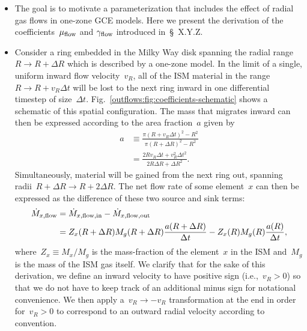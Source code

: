 \documentclass[main.tex]{subfiles}
\begin{document}
\begin{itemize}

	\item The goal is to motivate a parameterization that includes the effect
	of radial gas flows in one-zone GCE models.
	Here we present the derivation of the coefficients~$\mu_{\text{flow}}$ and
	$\gamma_{\text{flow}}$ introduced in~\S~X.Y.Z.

	\item Consider a ring embedded in the Milky Way disk spanning the radial
	range~$R \rightarrow R + \Delta R$ which is described by a one-zone model.
	In the limit of a single, uniform inward flow velocity~$v_R$, all of the
	ISM material in the range~$R \rightarrow R + v_R \Delta t$ will be lost
	to the next ring inward in one differential timestep of size~$\Delta t$.
	Fig.~\ref{outflows:fig:coefficients-schematic} shows a schematic of this
	spatial configuration.
	The mass that migrates inward can then be expressed according to the
	area fraction~$a$ given by
	\begin{equation}\begin{split}
	a &\equiv \frac{
		\pi \left(R + v_R \Delta t\right)^2 - R^2
	}{
		\pi \left(R + \Delta R\right)^2 - R^2
	}
	\\
	&= \frac{
		2 R v_R \Delta t + v_R^2 \Delta t^2
	}{
		2 R \Delta R + \Delta R^2
	}.
	\label{outflows:eq:area-frac-def}
	\end{split}\end{equation}
	Simultaneously, material will be gained from the next ring out, spanning
	radii~$R + \Delta R \rightarrow R + 2\Delta R$.
	The net flow rate of some element~$x$ can then be expressed as the
	difference of these two source and sink terms:
	\begin{equation}\begin{split}
	\dot{M}_{x,\text{flow}} &= \dot{M}_{x,\text{flow},\text{in}} -
	\dot{M}_{x,\text{flow},\text{out}}
	\\
	&= Z_x(R + \Delta R) M_g(R + \Delta R) \frac{a(R + \Delta R)}{\Delta t} -
	Z_x(R) M_g(R) \frac{a(R)}{\Delta t},
	\label{outflows:eq:flowin-minus-flowout}
	\end{split}\end{equation}
	where~$Z_x \equiv M_x / M_g$ is the mass-fraction of the element~$x$ in the
	ISM and~$M_g$ is the mass of the ISM gas itself.
	We clarify that for the sake of this derivation, we define an inward
	velocity to have positive sign (i.e.,~$v_R > 0$) so that we do not have to
	keep track of an additional minus sign for notational convenience.
	We then apply a~$v_R \rightarrow -v_R$ transformation at the end in order
	for~$v_R > 0$ to correspond to an outward radial velocity according to
	convention.


\end{itemize}
\end{document}
